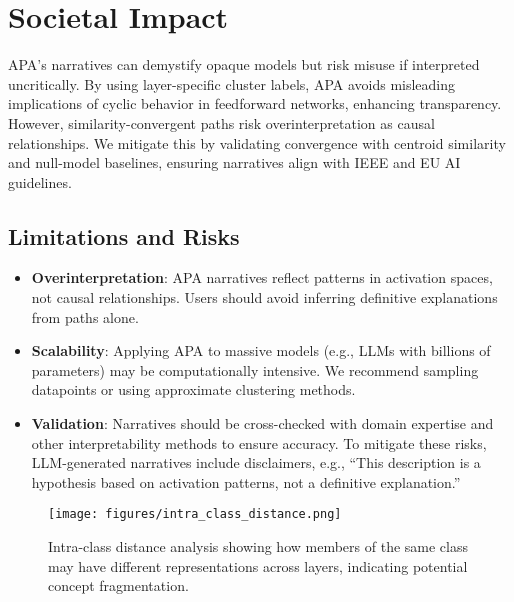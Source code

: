 \section{Societal Impact}

APA's narratives can demystify opaque models but risk misuse if interpreted uncritically. By using layer-specific cluster labels, APA avoids misleading implications of cyclic behavior in feedforward networks, enhancing transparency. However, similarity-convergent paths risk overinterpretation as causal relationships. We mitigate this by validating convergence with centroid similarity and null-model baselines, ensuring narratives align with IEEE and EU AI guidelines.

\subsection{Limitations and Risks}

\begin{itemize}
    \item \textbf{Overinterpretation}: APA narratives reflect patterns in activation spaces, not causal relationships. Users should avoid inferring definitive explanations from paths alone.
    \item \textbf{Scalability}: Applying APA to massive models (e.g., LLMs with billions of parameters) may be computationally intensive. We recommend sampling datapoints or using approximate clustering methods.
    \item \textbf{Validation}: Narratives should be cross-checked with domain expertise and other interpretability methods to ensure accuracy. To mitigate these risks, LLM-generated narratives include disclaimers, e.g., ``This description is a hypothesis based on activation patterns, not a definitive explanation.''
\end{itemize}

\begin{figure}[ht]
    \centering
    \texttt{[image: figures/intra\_class\_distance.png]}
    \caption{Intra-class distance analysis showing how members of the same class may have different representations across layers, indicating potential concept fragmentation.}
    \label{fig:intra_class_distance}
\end{figure}
